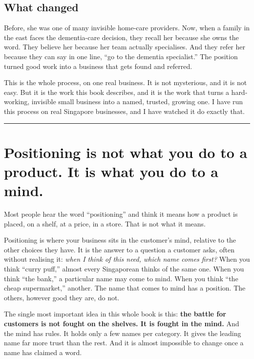\documentclass[10pt,twoside,openany]{memoir}
\newcommand{\needspacehead}{\needspace{4\baselineskip}}
\let\oldsection\section
\renewcommand{\section}{\needspacehead\oldsection}
\begin{document}
\section{What changed}\label{what-changed}

Before, she was one of many invisible home-care providers. Now, when a
family in the east faces the dementia-care decision, they recall her
because she owns the word. They believe her because her team actually
specialises. And they refer her because they can say in one line, ``go
to the dementia specialist.'' The position turned good work into a
business that gets found and referred.

This is the whole process, on one real business. It is not mysterious,
and it is not easy. But it is the work this book describes, and it is
the work that turns a hard-working, invisible small business into a
named, trusted, growing one. I have run this process on real Singapore
businesses, and I have watched it do exactly that.

\begin{center}\rule{0.5\linewidth}{0.5pt}\end{center}

\FloatBarrier
\chapter{Positioning is not what you do to a product. It is what you do
to a
mind.}\label{positioning-is-not-what-you-do-to-a-product.-it-is-what-you-do-to-a-mind.}

Most people hear the word ``positioning'' and think it means how a
product is placed, on a shelf, at a price, in a store. That is not what
it means.

Positioning is where your business sits in the customer's mind, relative
to the other choices they have. It is the answer to a question a
customer asks, often without realising it: \emph{when I think of this
need, which name comes first?} When you think ``curry puff,'' almost
every Singaporean thinks of the same one. When you think ``the bank,'' a
particular name may come to mind. When you think ``the cheap
supermarket,'' another. The name that comes to mind has a position. The
others, however good they are, do not.

The single most important idea in this whole book is this: \textbf{the
battle for customers is not fought on the shelves. It is fought in the
mind.} And the mind has rules. It holds only a few names per category.
It gives the leading name far more trust than the rest. And it is almost
impossible to change once a name has claimed a word.
\end{document}
